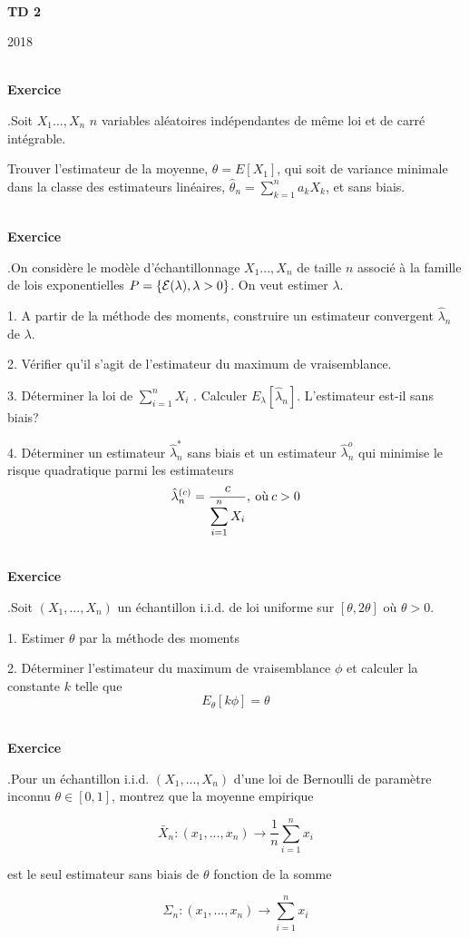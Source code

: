 \documentclass[11pt,a4paper]{article}
\newcommand{\R}{\mathbb{R}}\newcommand{\C}{\mathbb{C}}
\def \R{\mathbb{R}}
\def \Ec{{\cal E}}
\newcounter{exo}
\def\exo{\mbox{}\\[0em]\hspace*{0em}\bf Exercice
\addtocounter{exo}{1}\arabic{exo}.\rm\hspace{1ex}}
\begin{document}
\centerline{\sc \MSA}  \centerline{~}
\vskip1cm \centerline{{\bf TD 2}} \centerline{2018}


\vskip1cm




\exo Soit $X_1 ...,X_n$ $n$ variables aléatoires indépendantes
de même loi et de carré intégrable.

\vspace{3mm}

Trouver l'estimateur de la moyenne, $\theta = E [X_1]$, qui soit
de variance minimale dans la classe des estimateurs linéaires,
$\hat \theta_n = \sum_{k=1}^n a_k X_k$, et sans biais.

\vspace{3mm}





\exo On considère le modèle d'échantillonnage $X_1 ...,X_n$
de taille $n$ associé à la famille de lois exponentielles $P =
\{\Ec(\lambda), \lambda>0\}$. On veut estimer $\lambda$.

\vspace{3mm}

1. A partir de la méthode des moments, construire un estimateur
convergent $\hat \lambda_n$ de $\lambda$.

\vspace{3mm}

2. Vérifier qu'il s'agit de l'estimateur du maximum de
vraisemblance.

\vspace{3mm}

3. Déterminer la loi de $\sum_{i=1}^n  X_i$ . Calculer
$E_{\lambda}[\hat \lambda_n]$. L'estimateur est-il sans biais?

\vspace{3mm}

4. Déterminer un estimateur $\hat \lambda_n^*$ sans biais et un
estimateur $\hat \lambda_n^o$ qui minimise le risque quadratique
parmi les estimateurs $$\displaystyle \hat \lambda_n^{(c)} =
\frac{c}{\displaystyle\sum_{i=1}^n  X_i}, \: \hbox{où}\: c> 0$$

\exo Soit $(X_1,...,X_n)$ un échantillon i.i.d. de loi uniforme
sur $[\theta, 2 \theta]$ où $\theta > 0$.

1. Estimer $\theta$ par la méthode des moments

2. Déterminer l'estimateur du maximum de vraisemblance $\phi$ et
calculer la constante $k$ telle que $$E_{\theta} [k \phi] =
\theta$$


\exo Pour un échantillon i.i.d. $(X_1,...,X_n)$ d'une loi de
Bernoulli de paramètre inconnu $\theta \in [0,1]$, montrez que
la moyenne empirique

$$\bar X_n: (x_1,..., x_n) \rightarrow \displaystyle\frac{1}{n} \sum_{i=1}^n
x_i$$

est le seul estimateur sans biais de $\theta$ fonction de la somme

$$ \Sigma_n: (x_1,..., x_n) \rightarrow \displaystyle\sum_{i=1}^n
x_i$$
\end{document}
